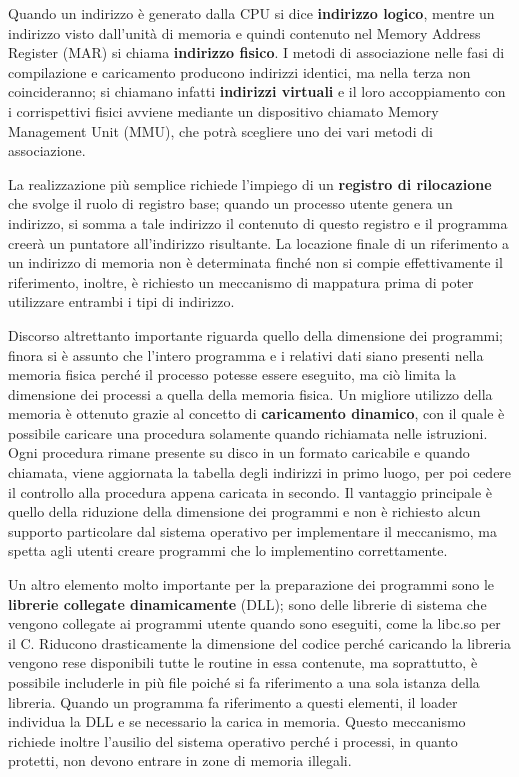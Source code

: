 \noindent Quando un indirizzo è generato dalla CPU si dice \textbf{indirizzo logico}, mentre un indirizzo visto dall'unità di memoria e quindi contenuto
nel Memory Address Register (MAR) si chiama \textbf{indirizzo fisico}. I metodi di associazione nelle fasi di compilazione e caricamento producono
indirizzi identici, ma nella terza non coincideranno; si chiamano infatti \textbf{indirizzi virtuali} e il loro accoppiamento con i corrispettivi fisici
avviene mediante un dispositivo chiamato Memory Management Unit (MMU), che potrà scegliere uno dei vari metodi di associazione.\par
La realizzazione più semplice richiede l'impiego di un \textbf{registro di rilocazione} che svolge il ruolo di registro base; quando un processo utente
genera un indirizzo, si somma a tale indirizzo il contenuto di questo registro e il programma creerà un puntatore all'indirizzo risultante. La locazione
finale di un riferimento a un indirizzo di memoria non è determinata finché non si compie effettivamente il riferimento, inoltre, è richiesto un
meccanismo di mappatura prima di poter utilizzare entrambi i tipi di indirizzo.\par
Discorso altrettanto importante riguarda quello della dimensione dei programmi; finora si è assunto che l'intero programma e i relativi dati siano
presenti nella memoria fisica perché il processo potesse essere eseguito, ma ciò limita la dimensione dei processi a quella della memoria fisica. Un
migliore utilizzo della memoria è ottenuto grazie al concetto di \textbf{caricamento dinamico}, con il quale è possibile caricare una procedura
solamente quando richiamata nelle istruzioni. Ogni procedura rimane presente su disco in un formato caricabile e quando chiamata, viene aggiornata la
tabella degli indirizzi in primo luogo, per poi cedere il controllo alla procedura appena caricata in secondo. Il vantaggio principale è quello della
riduzione della dimensione dei programmi e non è richiesto alcun supporto particolare dal sistema operativo per implementare il meccanismo, ma spetta
agli utenti creare programmi che lo implementino correttamente.\par
Un altro elemento molto importante per la preparazione dei programmi sono le \textbf{librerie collegate dinamicamente} (DLL); sono delle librerie di 
sistema che vengono collegate ai programmi utente quando sono eseguiti, come la libc.so per il C. Riducono drasticamente la dimensione del codice
perché caricando la libreria vengono rese disponibili tutte le routine in essa contenute, ma soprattutto, è possibile includerle in più file
poiché si fa riferimento a una sola istanza della libreria. Quando un programma fa riferimento a questi elementi, il loader individua la DLL e se
necessario la carica in memoria. Questo meccanismo richiede inoltre l'ausilio del sistema operativo perché i processi, in quanto protetti, non devono
entrare in zone di memoria illegali.

